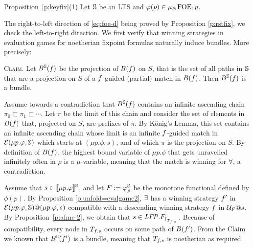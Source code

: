 
\begin{proofof}{Proposition~\ref{p:keyfix}(1)}
%    
Let $\mathbb{S}$ be an LTS and $\varphi(p) \in \mu_{N}\mathrm{FOE}_1{p}$. 

The right-to-left direction of \eqref{eq:foe-d} being proved by 
Proposition \ref{p:rstfix}, we check the left-to-right direction.
We first verify that winning strategies in evaluation games for noetherian 
fixpoint formulas naturally induce bundles. 
More precisely:
\medskip

\textsc{Claim.}
Let $B^{\mathbb{S}}(f)$ be the projection of $B(f)$ on $S$, that is the set
of all paths in $\mathbb{S}$ that are a projection on $S$ of a $f$-guided 
(partial) match in $B(f)$. Then $B^{\mathbb{S}}(f)$ is a bundle.
\medskip

\begin{pfclaim}
Assume towards a contradiction that $B^{\mathbb{S}}(f)$ contains an infinite 
ascending chain $\pi_{0} \sqsubset \pi_{1} \sqsubset \cdots$. 
Let $\pi$ be the limit of this chain and consider the set of elements in 
$B(f)$ that, projected on $S$, are prefixes of $\pi$. 
By  K\"{o}nig's Lemma, this set contains an infinite ascending chain whose 
limit is an infinite $f$-guided match in $\mathcal{E}(\mu p. \varphi,\mathbb{S})$
which starts at $(\mu p. \phi,s)$, and of which $\pi$ is the projection on $S$.
By definition of $B(f)$,  the highest bound variable of $\mu p. \phi$ 
that gets unravelled infinitely often in $\rho$ is a $\mu$-variable, meaning 
that the match is winning for $\forall$, a contradiction.
\end{pfclaim}

Assume that $s \in \llbracket\mu p.\varphi\rrbracket^{\mathbb{S}}$, and let $F \mathrel{:=}  \varphi_{p}^{\mathbb{S}}$ be the monotone functional defined by $\phi(p)$.
By Proposition \ref{p:unfold=evalgame2}, $\exists$ has a winning strategy 
$f'$ in $\mathcal{E}(\mu p.\varphi,\mathbb{S})@(\mu p.\varphi,s)$ compatible with a descending winning strategy $f$ in $\mathcal{U}_{F}@s$.
By Proposition~\ref{p:afmc-2}, we obtain 
that $s \in \mathit{LFP}. F_{{\upharpoonright}_{T_{f,s}}\,}$. 
Because of compatibility, every node in $T_{f, s}$ occurs on some path of 
$B(f')$. 
From the Claim
we known that $B^{\mathbb{S}}(f')$ is a bundle, meaning that  $T_{f, s}$ is
noetherian as required. 
\end{proofof}
